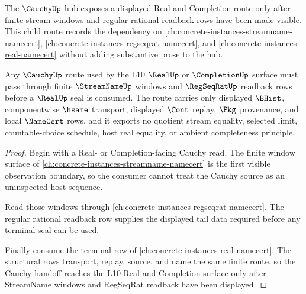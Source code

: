The $\CauchyUp$ hub exposes a displayed Real and Completion route only after finite stream windows and regular rational readback rows have been made visible. This child route records the dependency on \autoref{ch:concrete-instances-streamname-namecert}, \autoref{ch:concrete-instances-regseqrat-namecert}, and \autoref{ch:concrete-instances-real-namecert} without adding substantive prose to the hub.

\begin{theorem}
\label{thm:cauchy-displayed-regseqrat-route}
Any $\CauchyUp$ route used by the L10 $\RealUp$ or $\CompletionUp$ surface must pass through finite $\StreamNameUp$ windows and $\RegSeqRatUp$ readback rows before a $\RealUp$ seal is consumed. The route carries only displayed $\BHist$, componentwise $\hsame$ transport, displayed $\Cont$ replay, $\Pkg$ provenance, and local $\NameCert$ rows, and it exports no quotient stream equality, selected limit, countable-choice schedule, host real equality, or ambient completeness principle.
\end{theorem}
\begin{proof}
Begin with a Real- or Completion-facing Cauchy read. The finite window surface of \autoref{ch:concrete-instances-streamname-namecert} is the first visible observation boundary, so the consumer cannot treat the Cauchy source as an uninspected host sequence.

Read those windows through \autoref{ch:concrete-instances-regseqrat-namecert}. The regular rational readback row supplies the displayed tail data required before any terminal seal can be used.

Finally consume the terminal row of \autoref{ch:concrete-instances-real-namecert}. The structural rows transport, replay, source, and name the same finite route, so the Cauchy handoff reaches the L10 Real and Completion surface only after StreamName windows and RegSeqRat readback have been displayed.
\end{proof}
